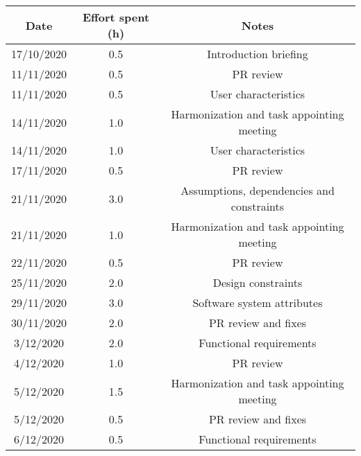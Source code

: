 \documentclass[../../main.tex]{subfiles}
\begin{document}
\begin{center}
    \begin{tabular}{|c| |c| |c|} 
        \hline
        Date & Effort spent (h) & Notes\\ [0.5ex] 
        \hline\hline
        17/10/2020 & 0.5 & Introduction briefing\\ 
        11/11/2020 & 0.5 & PR review\\
        11/11/2020 & 0.5 & User characteristics\\
        14/11/2020 & 1.0 & Harmonization and task appointing meeting\\
        14/11/2020 & 1.0 & User characteristics\\
        17/11/2020 & 0.5 & PR review\\
        21/11/2020 & 3.0 & Assumptions, dependencies and constraints\\
        21/11/2020 & 1.0 & Harmonization and task appointing meeting\\
        22/11/2020 & 0.5 & PR review\\
        25/11/2020 & 2.0 & Design constraints\\
        29/11/2020 & 3.0 & Software system attributes\\
        30/11/2020 & 2.0 & PR review and fixes\\
        3/12/2020 & 2.0 & Functional requirements\\
        4/12/2020 & 1.0 & PR review \\
        5/12/2020 & 1.5 & Harmonization and task appointing meeting\\
        5/12/2020 & 0.5 & PR review and fixes\\
        6/12/2020 & 0.5 & Functional requirements\\
        
        \hline
    \end{tabular}
\end{center}
\end{document}
